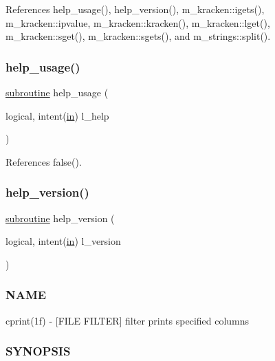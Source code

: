 References help\+\_\+usage(), help\+\_\+version(), m\+\_\+kracken\+::igets(), m\+\_\+kracken\+::ipvalue, m\+\_\+kracken\+::kracken(), m\+\_\+kracken\+::lget(), m\+\_\+kracken\+::sget(), m\+\_\+kracken\+::sgets(), and m\+\_\+strings\+::split().

\mbox{\label{cprint_8f90_a3e09a3b52ee8fb04eeb93fe5761626a8}} 
\subsubsection{\texorpdfstring{help\+\_\+usage()}{help\_usage()}}
{\footnotesize\ttfamily \hyperlink{M__stopwatch_83_8txt_acfbcff50169d691ff02d4a123ed70482}{subroutine} help\+\_\+usage (\begin{DoxyParamCaption}\item[{logical, intent(\hyperlink{M__journal_83_8txt_afce72651d1eed785a2132bee863b2f38}{in})}]{l\+\_\+help }\end{DoxyParamCaption})}



References false().

\mbox{\label{cprint_8f90_a39c21619b08a3c22f19e2306efd7f766}} 
\subsubsection{\texorpdfstring{help\+\_\+version()}{help\_version()}}
{\footnotesize\ttfamily \hyperlink{M__stopwatch_83_8txt_acfbcff50169d691ff02d4a123ed70482}{subroutine} help\+\_\+version (\begin{DoxyParamCaption}\item[{logical, intent(\hyperlink{M__journal_83_8txt_afce72651d1eed785a2132bee863b2f38}{in})}]{l\+\_\+version }\end{DoxyParamCaption})}



\subsubsection*{N\+A\+ME}

cprint(1f) -\/ \mbox{[}F\+I\+LE F\+I\+L\+T\+ER\mbox{]} filter prints specified columns \subsubsection*{S\+Y\+N\+O\+P\+S\+IS}

